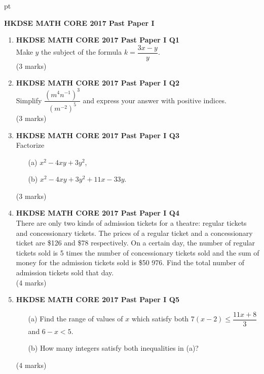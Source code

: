 \documentclass[12pt]{article}
\begin{document}
 pt
\begin{center}
	{\large \bf HKDSE MATH CORE 2017 Past Paper I}\\
	\vspace{2 mm}

\end{center}
\vspace{0.05cm}

\begin{enumerate}
	\item \textbf{HKDSE MATH CORE 2017 Past Paper I Q1}\\
	Make $y$ the subject of the formula $k = \dfrac{3x - y}{y}$. \\(3 marks)

	\item \textbf{HKDSE MATH CORE 2017 Past Paper I Q2}\\
	Simplify $\dfrac{(m^4n^{-1})^3}{(m^{-2})^5}$ and express your answer with positive indices. \\(3 marks)	

	\item \textbf{HKDSE MATH CORE 2017 Past Paper I Q3}\\
	Factorize
	\begin{enumerate}
		\item[(a)] $x^2 - 4xy + 3y^2$,
		\item[(b)] $x^2 - 4xy + 3y^2 + 11x - 33y$.
	\end{enumerate}
	(3 marks)

	\item \textbf{HKDSE MATH CORE 2017 Past Paper I Q4}\\
	There are only two kinds of admission tickets for a theatre: regular tickets and concessionary tickets. The prices of a regular ticket and a concessionary ticket are \$126 and \$78 respectively. On a certain day, the number of regular tickets sold is 5 times the number of concessionary tickets sold and the sum of money for the admission tickets sold is \$50 976. Find the total number of admission tickets sold that day. \\(4 marks)

	\item \textbf{HKDSE MATH CORE 2017 Past Paper I Q5}
	\begin{enumerate}
		\item[(a)] Find the range of values of $x$ which satisfy both $7(x - 2) \leq \dfrac{11x + 8}{3}$ and $6 - x < 5$.
		\item[(b)] How many integers satisfy both inequalities in (a)?
	\end{enumerate}
	(4 marks)


\end{enumerate}
\end{document}
